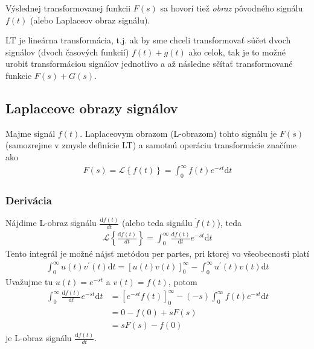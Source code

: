 \documentclass[a4paper, 10pt, ]{article}
\begin{document}
Výslednej transformovanej funkcii $F(s)$ sa hovorí tiež \emph{obraz} pôvodného signálu $f(t)$ (alebo Laplaceov obraz signálu).

LT je lineárna transformácia, t.j. ak by sme chceli transformovať súčet dvoch signálov (dvoch časových funkcií) $f(t) + g(t)$ ako celok, tak je to možné urobiť transformáciou signálov jednotlivo a až následne sčítať transformované funkcie $F(s) + G(s)$.

\subsection{Laplaceove obrazy signálov}

Majme signál $f(t)$. Laplaceovym obrazom (L-obrazom) tohto signálu je $F(s)$ (samozrejme v zmysle definície LT) a samotnú operáciu transformácie značíme ako
\begin{align}
    F(s)  =  \mathcal L \left\{ f(t) \right\} = \int_0^\infty f(t) e^{-st}\text{d}t
\end{align}




\subsubsection{Derivácia}

Nájdime L-obraz signálu $\frac{\text{d}f(t)}{dt}$ (alebo teda signálu $\dot f(t)$), teda
\begin{align}
    \mathcal L \left\{ \frac{\text{d}f(t)}{dt} \right\} = \int_0^\infty \frac{\text{d}f(t)}{\text{d}t} e^{-st}\text{d}t
\end{align}
Tento integrál je možné nájsť metódou per partes, pri ktorej vo všeobecnosti platí
\begin{align}
    \int_0^\infty u(t)v^\prime(t)\text{d}t = \left[ u(t)v(t) \right]_0^\infty - \int_0^\infty u^\prime(t) v(t) \text{d}t
\end{align}
Uvažujme tu $u(t) = e^{-st}$ a $v(t) = f(t)$, potom
\begin{equation}
    \begin{aligned}
        \int_0^\infty \frac{\text{d}f(t)}{\text{d}t} e^{-st}\text{d}t
            &=  \left[ e^{-st} f(t) \right]_0^\infty - (-s)  \int_0^\infty f(t) e^{-st}\text{d}t \\
            &= 0 - f(0) + s F(s) \\
            &= s F(s) - f(0)
    \end{aligned}
\end{equation}
je L-obraz signálu $\frac{\text{d}f(t)}{dt}$.
\end{document}
